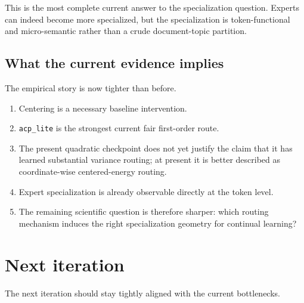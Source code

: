 \documentclass[11pt]{article}
\begin{document}
This is the most complete current answer to the specialization question. Experts can indeed become more specialized, but the specialization is token-functional and micro-semantic rather than a crude document-topic partition.

\subsection{What the current evidence implies}

The empirical story is now tighter than before.

\begin{enumerate}
    \item Centering is a necessary baseline intervention.
    \item \texttt{acp\_lite} is the strongest current fair first-order route.
    \item The present quadratic checkpoint does not yet justify the claim that it has learned substantial variance routing; at present it is better described as coordinate-wise centered-energy routing.
    \item Expert specialization is already observable directly at the token level.
    \item The remaining scientific question is therefore sharper: which routing mechanism induces the right specialization geometry for continual learning?
\end{enumerate}

\section{Next iteration}

The next iteration should stay tightly aligned with the current bottlenecks.
\end{document}
